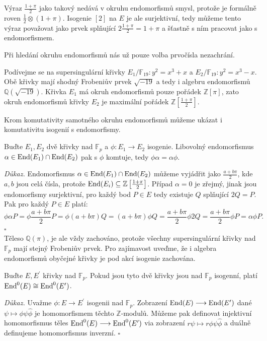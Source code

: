 \documentclass[12pt]{report}
\begin{document}
\begin{poznamka}
Výraz $\frac{1+\pi}{2}$ jako takový nedává v okruhu endomorfismů smysl, protože je formálně roven $\frac{1}{2} \otimes (1+\pi)$. Isogenie $[2]$ na $E$ je ale surjektivní, tedy můžeme tento výraz považovat jako prvek splňující $2 \frac{1+\pi}{2} = 1+\pi$ a šťastně s ním pracovat jako s endomorfismem.
\end{poznamka}

Při hledání okruhu endomorfismů nás už pouze volba prvočísla nezachrání.
\begin{priklad}
Podívejme se na supersingulární křivky $E_1/\mathbb{F}_{19} : y^2 = x^3 + x$ a $E_2/\mathbb{F}_{19} : y^2 = x^3-x$. Obě křivky mají shodný Frobeniův prvek $\sqrt{-19}$ a tedy i algebru endomorfismů $\mathbb{Q}(\sqrt{-19})$. Křivka $E_1$ má okruh endomorfismů pouze pořádek $\mathbb{Z}[\pi]$, zato okruh endomorfismů křivky $E_2$ je maximální pořádek $\mathbb{Z}\left[ \frac{1+\pi}{2} \right]$.
\end{priklad}

Krom komutativity samotného okruhu endomorfismů můžeme ukázat i komutativitu isogenií s endomorfismy.

\begin{lemma}\label{komut}
Buďte $E_1,E_2$ dvě křivky nad $\mathbb{F}_p$ a $\phi : E_1 \longrightarrow E_2$ isogenie. Libovolný endomorfismus $\alpha \in \operatorname{End}(E_1) \cap \operatorname{End}(E_2)$ pak s $\phi$ komtuje, tedy $\phi \alpha = \alpha \phi$.
\end{lemma}
\noindent \textit{Důkaz.} Endomorfismus $\alpha \in \operatorname{End}(E_1) \cap \operatorname{End}(E_2)$ můžeme vyjádřit jako $\frac{a+b \pi}{2}$, kde $a,b$ jsou celá čísla, protože $\operatorname{End}(E_i) \subseteq \mathbb{Z}\left[ \frac{1+\pi}{2} \right]$. Případ $\alpha = 0$ je zřejmý, jinak jsou endomorfismy surjektivní, pro každý bod $P \in E$ tedy existuje $Q$ splňující $2Q = P$. Pak pro každý $P \in E$ platí:
\begin{equation*}
\phi \alpha P = \phi \frac{a+b \pi}{2} P = \phi (a+b \pi) Q = (a+b \pi) \phi Q = \frac{a+b \pi}{2} \phi 2Q = \frac{a+ b \pi}{2} \phi P = \alpha \phi P.
\end{equation*}
\hfill $\square$\\


Těleso $\mathbb{Q}(\pi)$, je ale vždy zachováno, protože všechny supersingulární křivky nad $\mathbb{F}_p$ mají stejný Frobeniův prvek. Pro zajímavost uveďme, že i algebra endomorfismů obyčejné křivky je pod akcí isogenie zachována.

\begin{veta}
Buďte $E,E^\prime$ křivky nad $\mathbb{F}_p$. Pokud jsou tyto dvě křivky jsou nad $\mathbb{F}_p$ isogenní, platí $\operatorname{End}^0 (E) \cong \operatorname{End}^0 (E^\prime)$.
\end{veta}
\noindent \textit{Důkaz.} Uvažme $\phi : E \longrightarrow E^\prime$ isogenii nad $\mathbb{F}_p$. Zobrazení $\operatorname{End} (E) \longrightarrow \operatorname{End} (E^\prime)$ dané $\psi \mapsto \phi \psi \widehat{\phi}$ je homomorfismem těchto $\mathbb{Z}$-modulů. Můžeme pak definovat injektivní homomorfismus těles $\operatorname{End}^0 (E) \longrightarrow \operatorname{End}^0 (E^\prime)$ via zobrazení $r \psi \mapsto r \phi \psi \widehat{\phi}$ a duálně definujeme homomorfismus inverzní. \hfill $\square$\\
\end{document}
